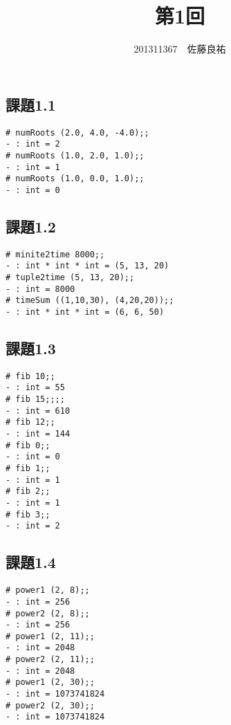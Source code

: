 \documentclass[11pt,a4j]{jarticle}
\title{第1回}
\author{201311367　佐藤良祐}
\begin{document}
\subsection*{課題1.1}


\begin{lstlisting}
# numRoots (2.0, 4.0, -4.0);;
- : int = 2
# numRoots (1.0, 2.0, 1.0);;
- : int = 1
# numRoots (1.0, 0.0, 1.0);;
- : int = 0
\end{lstlisting}

\subsection*{課題1.2}

\begin{lstlisting}
# minite2time 8000;;
- : int * int * int = (5, 13, 20)
# tuple2time (5, 13, 20);;
- : int = 8000
# timeSum ((1,10,30), (4,20,20));;
- : int * int * int = (6, 6, 50) 
\end{lstlisting}

\subsection*{課題1.3}

\begin{lstlisting}
# fib 10;;
- : int = 55
# fib 15;;;;
- : int = 610
# fib 12;;
- : int = 144
# fib 0;;
- : int = 0
# fib 1;;
- : int = 1
# fib 2;;
- : int = 1
# fib 3;;
- : int = 2
\end{lstlisting}

\subsection*{課題1.4}

\begin{lstlisting}
# power1 (2, 8);;
- : int = 256
# power2 (2, 8);;
- : int = 256
# power1 (2, 11);;
- : int = 2048
# power2 (2, 11);;
- : int = 2048
# power1 (2, 30);;
- : int = 1073741824
# power2 (2, 30);;
- : int = 1073741824
\end{lstlisting}
\end{document}
